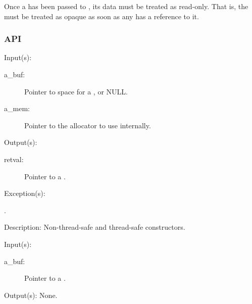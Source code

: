 Once a  has been passed to ,
its data must be treated as read-only.  That is, the  must be
treated as opaque as soon as any  has a reference to it.

\subsubsection{API}
\begin{capi}
\label{buf_new}
\label{buf_new_r}
	\begin{capilist}
	\item[Input(s): ]
		\begin{description}\item[]
		\item[a\_buf: ]
			Pointer to space for a , or NULL.
		\item[a\_mem: ]
			Pointer to the allocator to use internally.
		\end{description}
	\item[Output(s): ]
		\begin{description}\item[]
		\item[retval: ]
			Pointer to a .
		\end{description}
	\item[Exception(s): ]
		\begin{description}\item[]
		\item[.]
		\end{description}
	\item[Description: ]
		Non-thread-safe and thread-safe constructors.
	\end{capilist}
\label{buf_delete}
	\begin{capilist}
	\item[Input(s): ]
		\begin{description}\item[]
		\item[a\_buf: ]
			Pointer to a \classname{buf}.
		\end{description}
	\item[Output(s): ] None.

\end{capilist}
\end{capi}
